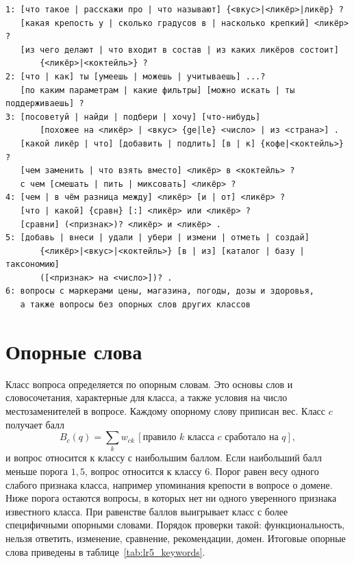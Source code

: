 {\footnotesize
\begin{verbatim}
1: [что такое | расскажи про | что называют] {<вкус>|<ликёр>|ликёр} ?
   [какая крепость у | сколько градусов в | насколько крепкий] <ликёр> ?
   [из чего делают | что входит в состав | из каких ликёров состоит]
       {<ликёр>|<коктейль>} ?
2: [что | как] ты [умеешь | можешь | учитываешь] ...?
   [по каким параметрам | какие фильтры] [можно искать | ты поддерживаешь] ?
3: [посоветуй | найди | подбери | хочу] [что-нибудь]
       [похожее на <ликёр> | <вкус> {ge|le} <число> | из <страна>] .
   [какой ликёр | что] [добавить | подлить] [в | к] {кофе|<коктейль>} ?
   [чем заменить | что взять вместо] <ликёр> в <коктейль> ?
   с чем [смешать | пить | миксовать] <ликёр> ?
4: [чем | в чём разница между] <ликёр> [и | от] <ликёр> ?
   [что | какой] {сравн} [:] <ликёр> или <ликёр> ?
   [сравни] (<признак>)? <ликёр> и <ликёр> .
5: [добавь | внеси | удали | убери | измени | отметь | создай]
       {<ликёр>|<вкус>|<коктейль>} [в | из] [каталог | базу | таксономию]
       ([<признак> на <число>])? .
6: вопросы с маркерами цены, магазина, погоды, дозы и здоровья,
   а также вопросы без опорных слов других классов
\end{verbatim}
}

\section{Опорные слова}

Класс вопроса определяется по опорным словам. Это основы слов и словосочетания, характерные для класса, а также условия на число местозаменителей в вопросе. Каждому опорному слову приписан вес. Класс $c$ получает балл
\begin{equation}
	B_c(q) = \sum_{k} w_{ck}\,[\text{правило } k \text{ класса } c \text{ сработало на } q],
	\label{eq:lr5_score}
\end{equation}
и вопрос относится к классу с наибольшим баллом. Если наибольший балл меньше порога $1{,}5$, вопрос относится к классу 6. Порог равен весу одного слабого признака класса, например упоминания крепости в вопросе о домене. Ниже порога остаются вопросы, в которых нет ни одного уверенного признака известного класса. При равенстве баллов выигрывает класс с более специфичными опорными словами. Порядок проверки такой: функциональность, нельзя ответить, изменение, сравнение, рекомендации, домен. Итоговые опорные слова приведены в таблице~\ref{tab:lr5_keywords}.

